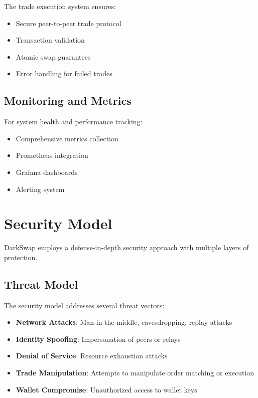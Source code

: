 \documentclass[11pt,a4paper]{article}
\begin{document}
The trade execution system ensures:

\begin{itemize}
    \item Secure peer-to-peer trade protocol
    \item Transaction validation
    \item Atomic swap guarantees
    \item Error handling for failed trades
\end{itemize}

\subsection{Monitoring and Metrics}

For system health and performance tracking:

\begin{itemize}
    \item Comprehensive metrics collection
    \item Prometheus integration
    \item Grafana dashboards
    \item Alerting system
\end{itemize}

\section{Security Model}

DarkSwap employs a defense-in-depth security approach with multiple layers of protection.

\subsection{Threat Model}

The security model addresses several threat vectors:

\begin{itemize}
    \item \textbf{Network Attacks}: Man-in-the-middle, eavesdropping, replay attacks
    \item \textbf{Identity Spoofing}: Impersonation of peers or relays
    \item \textbf{Denial of Service}: Resource exhaustion attacks
    \item \textbf{Trade Manipulation}: Attempts to manipulate order matching or execution
    \item \textbf{Wallet Compromise}: Unauthorized access to wallet keys
\end{itemize}
\end{document}
